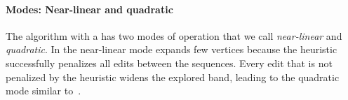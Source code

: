 \paragraph{Modes: Near-linear and quadratic}

The \A algorithm with a \sh has two modes of operation that we call
\emph{near-linear} and \emph{quadratic}. In the near-linear mode \astarpa expands few
vertices because the heuristic successfully penalizes all edits
between the sequences. Every edit that is not penalized by the heuristic widens
the explored band, leading to the quadratic mode similar to~\dijkstra.
